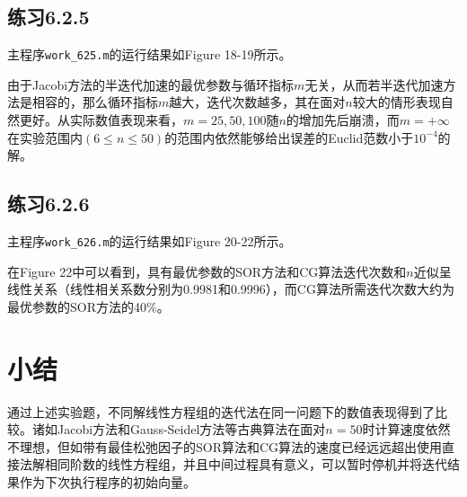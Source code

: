 \documentclass[UTF8,a4paper,10pt]{ctexart}
\begin{document}
    \subsection{练习6.2.5}
        \par
        主程序\texttt{work\_625.m}的运行结果如Figure 18-19所示。
        \par
        由于Jacobi方法的半迭代加速的最优参数与循环指标$m$无关，从而若半迭代加速方法是相容的，那么循环指标$m$越大，迭代次数越多，其在面对$n$较大的情形表现自然更好。从实际数值表现来看，$m=25,50,100$随$n$的增加先后崩溃，而$m=+\infty$在实验范围内$(6\le n\le 50)$的范围内依然能够给出误差的Euclid范数小于$10^{-4}$的解。
    \subsection{练习6.2.6}
        \par
        主程序\texttt{work\_626.m}的运行结果如Figure 20-22所示。
        \par
        在Figure 22中可以看到，具有最优参数的SOR方法和CG算法迭代次数和$n$近似呈线性关系（线性相关系数分别为0.9981和0.9996），而CG算法所需迭代次数大约为最优参数的SOR方法的40\%。
\section{小结}
    \par
    通过上述实验题，不同解线性方程组的迭代法在同一问题下的数值表现得到了比较。诸如Jacobi方法和Gauss-Seidel方法等古典算法在面对$n=50$时计算速度依然不理想，但如带有最佳松弛因子的SOR算法和CG算法的速度已经远远超出使用直接法解相同阶数的线性方程组，并且中间过程具有意义，可以暂时停机并将迭代结果作为下次执行程序的初始向量。
\end{document}
